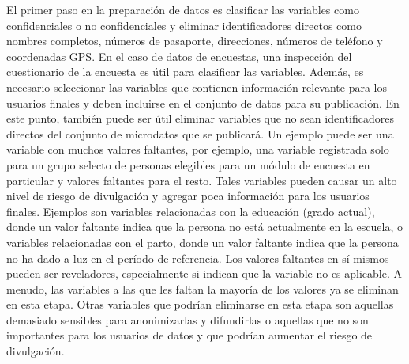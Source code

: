 \documentclass[
]{book}
\theoremstyle{definition}
\theoremstyle{definition}
\theoremstyle{definition}
\theoremstyle{definition}
\theoremstyle{remark}
\begin{document}
El primer paso en la preparación de datos es clasificar las variables como confidenciales o no confidenciales y eliminar identificadores directos como nombres completos, números de pasaporte, direcciones, números de teléfono y coordenadas GPS. En el caso de datos de encuestas, una inspección del cuestionario de la encuesta es útil para clasificar las variables. Además, es necesario seleccionar las variables que contienen información relevante para los usuarios finales y deben incluirse en el conjunto de datos para su publicación. En este punto, también puede ser útil eliminar variables que no sean identificadores directos del conjunto de microdatos que se publicará. Un ejemplo puede ser una variable con muchos valores faltantes, por ejemplo, una variable registrada solo para un grupo selecto de personas elegibles para un módulo de encuesta en particular y valores faltantes para el resto. Tales variables pueden causar un alto nivel de riesgo de divulgación y agregar poca información para los usuarios finales. Ejemplos son variables relacionadas con la educación (grado actual), donde un valor faltante indica que la persona no está actualmente en la escuela, o variables relacionadas con el parto, donde un valor faltante indica que la persona no ha dado a luz en el período de referencia. Los valores faltantes en sí mismos pueden ser reveladores, especialmente si indican que la variable no es aplicable. A menudo, las variables a las que les faltan la mayoría de los valores ya se eliminan en esta etapa. Otras variables que podrían eliminarse en esta etapa son aquellas demasiado sensibles para anonimizarlas y difundirlas o aquellas que no son importantes para los usuarios de datos y que podrían aumentar el riesgo de divulgación.
\end{document}
